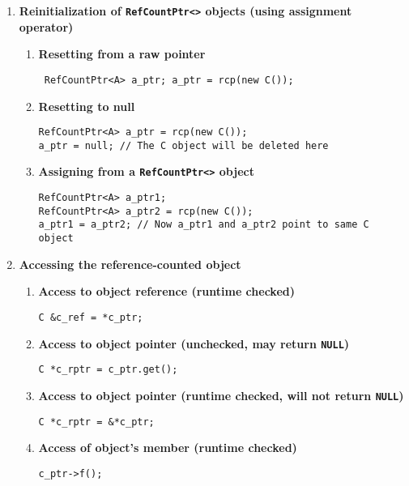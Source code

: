 \documentclass[pdf,ps2pdf,11pt]{SANDreport}
\begin{document}
\begin{enumerate}
\item {\bf Reinitialization of \texttt{RefCountPtr<>} objects (using assignment operator)}
%
\begin{enumerate}
%
\item {\bf Resetting from a raw pointer}
%
{\small\begin{verbatim} RefCountPtr<A> a_ptr; a_ptr = rcp(new C());
\end{verbatim}}
%
\item {\bf Resetting to null}
%
{\small\begin{verbatim}
RefCountPtr<A> a_ptr = rcp(new C());
a_ptr = null; // The C object will be deleted here
\end{verbatim}}
%
\item {\bf Assigning from a \texttt{RefCountPtr<>} object}
%
{\small\begin{verbatim}
RefCountPtr<A> a_ptr1;
RefCountPtr<A> a_ptr2 = rcp(new C());
a_ptr1 = a_ptr2; // Now a_ptr1 and a_ptr2 point to same C object
\end{verbatim}}
%
\end{enumerate}

\item {\bf Accessing the reference-counted object}
%
\begin{enumerate}
%
\item {\bf Access to object reference (runtime checked)}
%
{\small\begin{verbatim}
C &c_ref = *c_ptr;
\end{verbatim}}
%
\item {\bf Access to object pointer (unchecked, may return \texttt{NULL})}
%
{\small\begin{verbatim}
C *c_rptr = c_ptr.get();
\end{verbatim}}
%
\item {\bf Access to object pointer (runtime checked, will not return \texttt{NULL})}
%
{\small\begin{verbatim}
C *c_rptr = &*c_ptr;
\end{verbatim}}
%
\item {\bf Access of object's member (runtime checked)}
%
{\small\begin{verbatim}
c_ptr->f();
\end{verbatim}}
%
\end{enumerate}


\end{enumerate}
\end{document}
